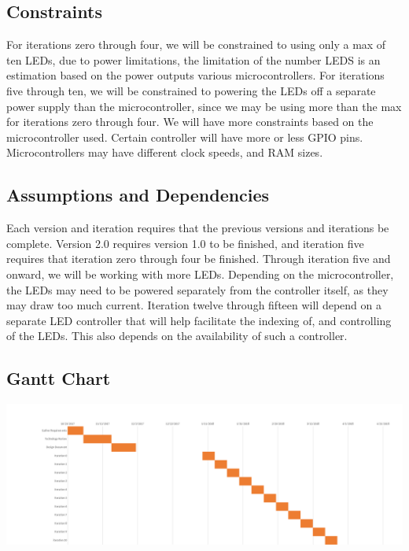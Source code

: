 		\subsection{Constraints}
		For iterations zero through four, we will be constrained to using only a max of ten LEDs, due to power limitations, the limitation of the number LEDS is an estimation based on the power outputs various microcontrollers. For iterations five through ten, we will be constrained to powering the LEDs off a separate power supply than the microcontroller,
		since we may be using more than the max for iterations zero through four. We will have more constraints based on the microcontroller used. Certain controller will have more or less GPIO pins. Microcontrollers may have different clock speeds, and RAM sizes.

		\subsection{Assumptions and Dependencies}
		Each version and iteration requires that the previous versions and iterations be complete. Version 2.0 requires version 1.0 to be finished, and iteration five requires that iteration zero through four be finished.
		Through iteration five and onward, we will be working with more LEDs. Depending on the microcontroller, the LEDs may need to be powered separately from the controller itself, as they may draw too much current.
		Iteration twelve through fifteen will depend on a separate LED controller that will help facilitate the indexing of, and controlling of the LEDs. This also depends on the availability of such a controller.

		\newpage
		\begin{landscape}
		\subsection{Gantt Chart}
		\includegraphics[width=\linewidth]{Gant.png}
		\end{landscape}
		\newpage


